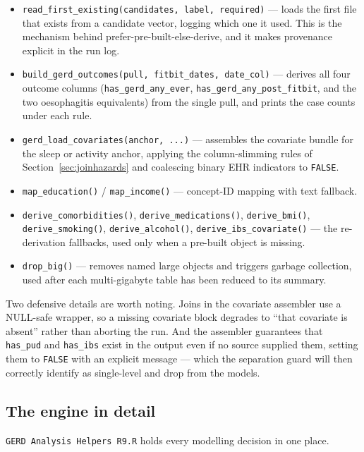 \documentclass[11pt]{article}
\newcommand{\code}[1]{\texttt{\small #1}}
\begin{document}
\begin{itemize}[leftmargin=1.4em,itemsep=2pt]
  \item \code{read_first_existing(candidates, label, required)} --- loads the first file that exists
  from a candidate vector, logging which one it used. This is the mechanism behind
  prefer-pre-built-else-derive, and it makes provenance explicit in the run log.
  \item \code{build_gerd_outcomes(pull, fitbit_dates, date_col)} --- derives all four outcome columns
  (\code{has_gerd_any_ever}, \code{has_gerd_any_post_fitbit}, and the two oesophagitis equivalents) from the
  single pull, and prints the case counts under each rule.
  \item \code{gerd_load_covariates(anchor, ...)} --- assembles the covariate bundle for the sleep or
  activity anchor, applying the column-slimming rules of Section~\ref{sec:joinhazards} and coalescing
  binary EHR indicators to \code{FALSE}.
  \item \code{map_education()} / \code{map_income()} --- concept-ID mapping with text fallback.
  \item \code{derive_comorbidities()}, \code{derive_medications()}, \code{derive_bmi()},
  \code{derive_smoking()}, \code{derive_alcohol()}, \code{derive_ibs_covariate()} --- the
  re-derivation fallbacks, used only when a pre-built object is missing.
  \item \code{drop_big()} --- removes named large objects and triggers garbage collection, used after
  each multi-gigabyte table has been reduced to its summary.
\end{itemize}

\noindent Two defensive details are worth noting. Joins in the covariate assembler use a NULL-safe
wrapper, so a missing covariate block degrades to ``that covariate is absent'' rather than aborting
the run. And the assembler guarantees that \code{has_pud} and \code{has_ibs} exist in the output even
if no source supplied them, setting them to \code{FALSE} with an explicit message --- which the
separation guard will then correctly identify as single-level and drop from the models.

\subsection{The engine in detail}
\code{GERD Analysis Helpers R9.R} holds every modelling decision in one place.
\end{document}
